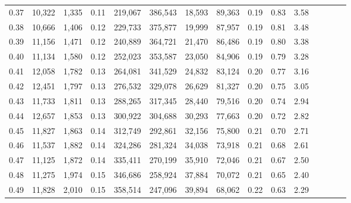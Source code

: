 \begin{tabular}{rrrcrrrrrrrrrrr}
0.37 &  10,322 &  1,335 &                                       0.11 &  219,067 &  386,543 &   18,593 &   89,363 &  0.19 &  0.83 &                         3.58 \\
0.38 &  10,666 &  1,406 &                                       0.12 &  229,733 &  375,877 &   19,999 &   87,957 &  0.19 &  0.81 &                         3.48 \\
0.39 &  11,156 &  1,471 &                                       0.12 &  240,889 &  364,721 &   21,470 &   86,486 &  0.19 &  0.80 &                         3.38 \\
0.40 &  11,134 &  1,580 &                                       0.12 &  252,023 &  353,587 &   23,050 &   84,906 &  0.19 &  0.79 &                         3.28 \\
0.41 &  12,058 &  1,782 &                                       0.13 &  264,081 &  341,529 &   24,832 &   83,124 &  0.20 &  0.77 &                         3.16 \\
0.42 &  12,451 &  1,797 &                                       0.13 &  276,532 &  329,078 &   26,629 &   81,327 &  0.20 &  0.75 &                         3.05 \\
0.43 &  11,733 &  1,811 &                                       0.13 &  288,265 &  317,345 &   28,440 &   79,516 &  0.20 &  0.74 &                         2.94 \\
0.44 &  12,657 &  1,853 &                                       0.13 &  300,922 &  304,688 &   30,293 &   77,663 &  0.20 &  0.72 &                         2.82 \\
0.45 &  11,827 &  1,863 &                                       0.14 &  312,749 &  292,861 &   32,156 &   75,800 &  0.21 &  0.70 &                         2.71 \\
0.46 &  11,537 &  1,882 &                                       0.14 &  324,286 &  281,324 &   34,038 &   73,918 &  0.21 &  0.68 &                         2.61 \\
0.47 &  11,125 &  1,872 &                                       0.14 &  335,411 &  270,199 &   35,910 &   72,046 &  0.21 &  0.67 &                         2.50 \\
0.48 &  11,275 &  1,974 &                                       0.15 &  346,686 &  258,924 &   37,884 &   70,072 &  0.21 &  0.65 &                         2.40 \\
0.49 &  11,828 &  2,010 &                                       0.15 &  358,514 &  247,096 &   39,894 &   68,062 &  0.22 &  0.63 &                         2.29 \\

\end{tabular}
